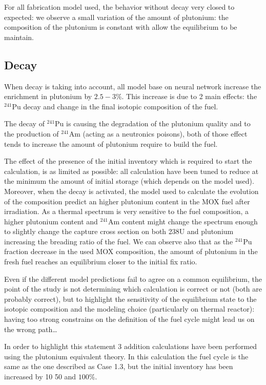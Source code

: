 \documentclass[10pt]{article}
\begin{document}
For all fabrication model used, the behavior without decay very closed to
expected: we observe a small variation of the amount of plutonium: the
composition of the plutonium is constant with allow the equilibrium to be
maintain. 


\subsection{Decay}

When decay is taking into account, all model base on neural network increase the
enrichment in plutonium by $2.5-3\%$. This increase is due to 2 main effects: the
$^{241}$Pu decay and change in the final isotopic composition of the fuel.

The decay of $^{241}$Pu is causing the degradation of the plutonium quality and to
the production of $^{241}$Am (acting as a neutronics poisons), both of those effect
tends to increase the amount of plutonium require to build the fuel.

The effect of the presence of the initial inventory which is required to start
the calculation, is as limited as possible: all calculation have been tuned to
reduce at the minimum the amount of initial storage (which depends on the model
used).
Moreover, when the decay is activated, the model used to calculate the evolution
of the composition predict an higher plutonium content in the MOX fuel after
irradiation. As a thermal spectrum is very sensitive to the fuel composition, a
higher plutonium content and $^{241}$Am content might change the spectrum enough to
slightly change the capture cross section on both 238U and plutonium increasing
the breading ratio of the fuel. 
We can observe also that as the $^{241}$Pu fraction decrease in the used MOX
composition, the amount of plutonium in the fresh fuel reaches an equilibrium
closer to the initial fix ratio.


Even if the different model predictions fail to agree on a common equilibrium,
the point of the study is not determining which calculation is correct or not
(both are probably correct), but to highlight the sensitivity of the equilibrium
state to the isotopic composition and the modeling choice (particularly on
thermal reactor): having too strong constrains on the definition of the fuel
cycle might lead us on the wrong path\dots


In order to highlight this statement 3 addition calculations have been performed
using the plutonium equivalent theory.  In this calculation the fuel cycle is
the same as the one described as Case 1.3, but the initial inventory has been
increased by 10 50 and $100\%$.








\end{document}
